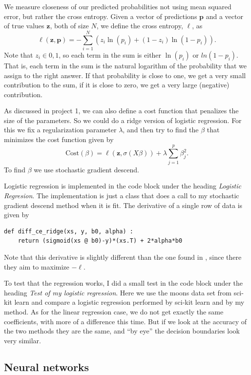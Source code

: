 \documentclass[parskip=half]{scrartcl}
\theoremstyle{definition}
\theoremstyle{remark}
\newcommand{\vect}[1]{{\bm{#1}}}
\begin{document}
We measure closeness of our predicted probabilities not using mean squared error, but rather the cross entropy. 
Given a vector of predictions $\vect{p}$ and a vector of true values $\vect{z}$, both of size $N$, we define the cross entropy, $\ell$, as 
\[
	\ell(\vect{z}, \vect{p}) = - \sum_{i=1}^N \left( z_i \ln(p_i) + (1-z_i) \ln(1 - p_i)  \right).
\]
Note that $z_i \in {0,1}$, so each term in the sum is either $\ln(p_i)$ or $ln(1-p_i)$. 
That is, each term in the sum is the natural logarithm of the probability that we assign to the right answer.
If that probability is close to one, we get a very small contribution to the sum, if it is close to zero, we get a very large (negative) contribution. 

As discussed in project 1, we can also define a cost function that penalizes the size of the parameters. 
So we could do a ridge version of logistic regression. 
For this we fix a regularization parameter $\lambda$, and then try to find the $\beta$ that minimizes the cost function given by
\[
 \text{Cost}(\beta) = \ell(\vect{z}, \sigma(X \beta)) +  \lambda \sum_{j=1}^p \beta_j^2.
\]
To find $\beta$ we use stochastic gradient descend. 
 
Logistic regression is implemented in the code block under the heading \emph{Logistic Regresion}.
The implementation is just a class that does a call to my stochastic gradient descend method when it is fit. 
The derivative of a single row of data is given by 
\begin{verbatim}
def diff_ce_ridge(xs, y, b0, alpha) :
    return (sigmoid(xs @ b0)-y)*(xs.T) + 2*alpha*b0
\end{verbatim}
Note that this derivative is slightly different than the one found in \cite{Ng}, since there they aim to maximize $-\ell$.

To test that the regression works, I did a small test in the code block under the heading \emph{Test of my logistic regression}.
Here we use the moons data set from sci-kit learn and compare a logistic regression performed by sci-kit learn and by my method. 
As for the linear regression case, we do not get exactly the same coefficients, with more of a difference this time. 
But if we look at the accuracy of the two methods they are the same, and ``by eye'' the decision boundaries look very similar.   

\subsection{Neural networks} \label{sec:neuralnet} 
 
\end{document}
